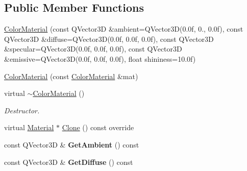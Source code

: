 \subsection*{Public Member Functions}
\begin{DoxyCompactItemize}
\item 
\mbox{\hyperlink{class_geometry_engine_1_1_geometry_material_1_1_color_material_af445424ce4cb91403b9623cee72fdf92}{Color\+Material}} (const Q\+Vector3D \&ambient=Q\+Vector3D(0.\+0f, 0., 0.\+0f), const Q\+Vector3\+D \&diffuse=\+Q\+Vector3\+D(0.\+0f, 0.\+0f, 0.\+0f), const Q\+Vector3\+D \&specular=\+Q\+Vector3\+D(0.\+0f, 0.\+0f, 0.\+0f), const Q\+Vector3\+D \&emissive=\+Q\+Vector3\+D(0.\+0f, 0.\+0f, 0.\+0f), float shininess=10.\+0f)
\item 
\mbox{\hyperlink{class_geometry_engine_1_1_geometry_material_1_1_color_material_a42495fe930beb678d0c31a93045572e3}{Color\+Material}} (const \mbox{\hyperlink{class_geometry_engine_1_1_geometry_material_1_1_color_material}{Color\+Material}} \&mat)
\item 
\mbox{\label{class_geometry_engine_1_1_geometry_material_1_1_color_material_a7d7fcbb8896167b79be5e2e1938f963c}} 
virtual \mbox{\hyperlink{class_geometry_engine_1_1_geometry_material_1_1_color_material_a7d7fcbb8896167b79be5e2e1938f963c}{$\sim$\+Color\+Material}} ()
\begin{DoxyCompactList}\small\item\em Destructor. \end{DoxyCompactList}\item 
virtual \mbox{\hyperlink{class_geometry_engine_1_1_geometry_material_1_1_material}{Material}} $\ast$ \mbox{\hyperlink{class_geometry_engine_1_1_geometry_material_1_1_color_material_a29dbf04e76b75fcc86f184d072bba0a5}{Clone}} () const override
\item 
\mbox{\label{class_geometry_engine_1_1_geometry_material_1_1_color_material_a571c8da3087b608f6fda63958c1c9901}} 
const Q\+Vector3D \& {\bfseries Get\+Ambient} () const
\item 
\mbox{\label{class_geometry_engine_1_1_geometry_material_1_1_color_material_a24a6e72f950f482d1bcd4334c8268d6c}} 
const Q\+Vector3D \& {\bfseries Get\+Diffuse} () const
\item 

\end{DoxyCompactItemize}
